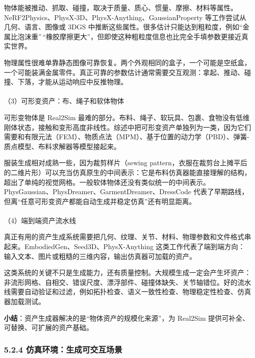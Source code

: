 \documentclass[
  chinese,
]{ctexart}
\makeatletter
\let\oldparagraph\paragraph
\renewcommand{\paragraph}{
    \@ifstar
      \xxxParagraphStar
      \xxxParagraphNoStar
  }
\newcommand{\xxxParagraphStar}[1]{\oldparagraph*{#1}\mbox{}}
\newcommand{\xxxParagraphNoStar}[1]{\oldparagraph{#1}\mbox{}}
\makeatother
\begin{document}
物体能被推动、抓取、碰撞，取决于质量、质心、惯量、摩擦、材料等属性。NeRF2Physics、PhysX-3D、PhysX-Anything、GaussianProperty
等工作尝试从几何、语言、图像或 3DGS
中推断这些属性。很多估计只能达到粗粒度，例如``金属比泡沫重''\,``橡胶摩擦更大''，但即使这种粗粒度信息也比完全手填参数更接近真实世界。

物理属性很难单靠静态图像可靠恢复。两个外观相同的盒子，一个可能是空纸盒，一个可能装满金属零件。真正可靠的参数估计通常需要交互观测：拿起、推动、碰撞、下落，才能从运动响应中反推物理。

\paragraph{（3）可形变资产：布、绳子和软体物体}\label{ux53efux5f62ux53d8ux8d44ux4ea7ux5e03ux7ef3ux5b50ux548cux8f6fux4f53ux7269ux4f53}

可形变物体是 Real2Sim
最难的部分。布料、绳子、软玩具、包裹、食物没有低维刚体状态，接触和变形高度非线性。综述中把可形变资产单独列为一类，因为它们需要和有限元法（FEM）、物质点法（MPM）、基于位置的动力学（PBD）、弹簧-质点模型、布料求解器等模型接起来。

服装生成相对成熟一些，因为裁剪样片（sewing
pattern，衣服在裁剪台上摊平后的二维片形）可以充当仿真原生的中间表示：它是布料仿真器能直接理解的结构，超出了单纯的视觉网格。一般软体物体还没有类似统一的中间表示。PhysGaussian、PhysDreamer、GarmentDreamer、DressCode
代表了早期路线，但离``任意可形变资产都能自动生成并稳定仿真''还有明显距离。

\paragraph{（4）端到端资产流水线}\label{ux7aefux5230ux7aefux8d44ux4ea7ux6d41ux6c34ux7ebf}

真正有用的资产生成系统需要把几何、纹理、关节、材料、物理参数和文件格式串起来。EmbodiedGen、Seed3D、PhysX-Anything
这类工作代表了端到端方向：输入文本、图片或粗糙的三维内容，输出仿真器可加载的资产。

这类系统的关键不只是生成能力，还有质量控制。大规模生成一定会产生坏资产：非流形网格、自相交、错误尺度、漂浮部件、碰撞体缺失、关节轴错位。好的流水线需要自动验证和过滤，例如拓扑检查、语义一致性检查、物理稳定性检查、仿真器加载测试。

\textbf{小结}：资产生成器解决的是``物体资产的规模化来源''，为 Real2Sim
提供可补全、可替换、可扩展的资产基础。

\subsubsection{5.2.4
仿真环境：生成可交互场景}\label{ux4effux771fux73afux5883ux751fux6210ux53efux4ea4ux4e92ux573aux666f}
\end{document}
